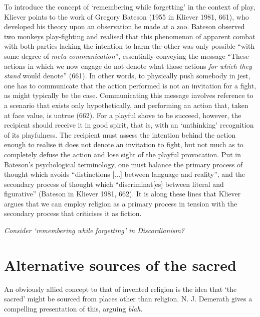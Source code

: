 \documentclass[Draft.tex]{subfiles}
\begin{document}
To introduce the concept of `remembering while forgetting'
in the context of play, Kliever points to the work of 
Gregory Bateson (1955 in Kliever 1981, 661),
who developed his theory upon an observation he made at a zoo.
Bateson observed two monkeys play-fighting and realised that
this phenomenon of apparent combat with both parties lacking
the intention to harm the other was only possible 
``with some degree of \textit{meta-communication}'',
essentially conveying the message 
``These actions in which we now engage do not denote
what those actions \textit{for which they stand} would denote'' (661).
In other words, to physically push somebody in jest,
one has to communicate that the action performed
is not an invitation for a fight, as might typically be the case.
Communicating this message involves reference to
a scenario that exists only hypothetically, and
performing an action that, taken at face value, is untrue (662).
For a playful shove to be succeed, however,
the recipient should receive it in good spirit, that is,
with an `unthinking' recognition of its playfulness.
The recipient must assess the intention behind the action enough
to realise it does not denote an invitation to fight,
but not much as to completely defuse the action
and lose sight of the playful provocation.
Put in Bateson's psychological terminology,
one must balance the primary process of thought which
avoids ``distinctions [...] between language and reality'',
and the secondary process of thought
which ``discriminat[es] between literal and figurative''
(Bateson in Kliever 1981, 662).
It is along these lines that Kliever argues that we can
employ religion as a primary process in tension with
the secondary process that criticises it as fiction.

\textit{Consider `remembering while forgetting' in Discordianism?}


\section*{Alternative sources of the sacred}
An obviously allied concept to that of invented religion
is the idea that `the sacred' might be sourced
from places other than religion.
N. J. Demerath \parencite*{Demerath00} gives a compelling presentation
of this, arguing \textit{blah}.
\end{document}
